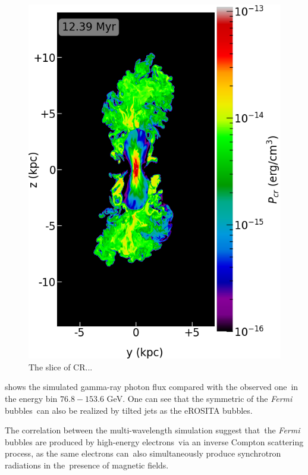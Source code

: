 \documentclass[twocolumn]{aastex631}
\begin{document}
  \begin{figure}
    \includegraphics[width=\columnwidth]{figures/fig__jetI5+ismSeed3-45deg-CR.png}
    \caption{The slice of CR...}
    \label{fig__jetI5+ismSeed3-45deg-CR}
  \end{figure}


 shows the simulated gamma-ray photon flux compared with the observed one\
in the energy bin $76.8-153.6$ GeV. One can see that the symmetric of the \textit{Fermi} bubbles\
can also be realized by tilted jets as the eROSITA bubbles.\

The correlation between the multi-wavelength simulation suggest that\
the \textit{Fermi} bubbles are produced by high-energy electrons\
via an inverse Compton scattering process, as the same electrons can\
also simultaneously produce synchrotron radiations in the\
presence of magnetic fields.
\end{document}
